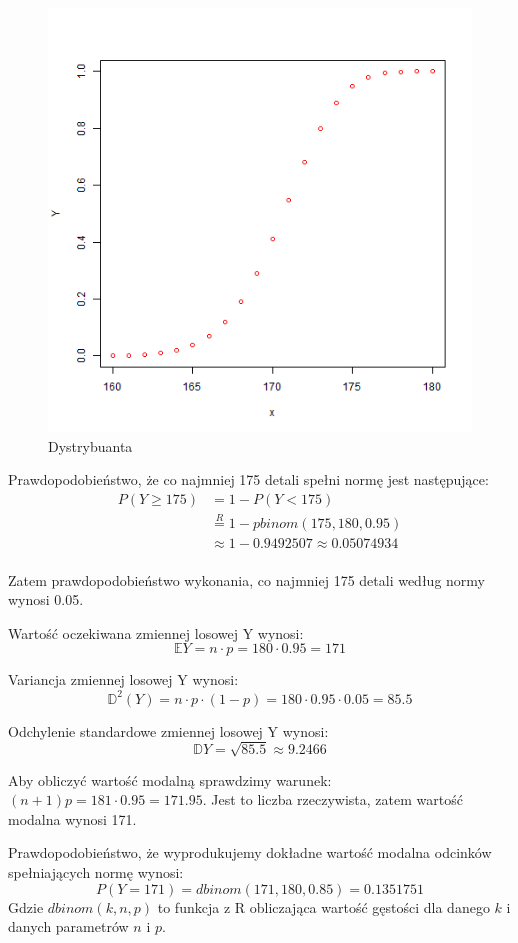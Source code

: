 \documentclass{article}
\begin{document}
\begin{figure}[h!]
\begin{center}
\includegraphics[height=0.4\textheight, angle=0]{"lab4zad1_f.png"}
\caption{Dystrybuanta}
\end{center}
\end{figure}

\newpage
Prawdopodobieństwo, że co najmniej 175 detali spełni normę jest następujące:
\begin{align*}
	P(Y\geq175) & = 1 - P(Y<175) \\
	& \overset{R}{=} 1 - pbinom(175,180,0.95) \\
	& \approx 1 - 0.9492507 \approx 0.05074934
\end{align*} \\
Zatem prawdopodobieństwo wykonania, co najmniej 175 detali według normy wynosi 0.05.
\par
Wartość oczekiwana zmiennej losowej Y wynosi:
$$\mathbb{E}Y = n\cdot p = 180\cdot0.95 = 171$$
\par
Variancja zmiennej losowej Y wynosi:
$$\mathbb{D}^2(Y) = n\cdot p\cdot(1-p) = 180\cdot 0.95\cdot0.05 = 85.5$$
\par
Odchylenie standardowe zmiennej losowej Y wynosi:
$$\mathbb{D}Y = \sqrt{85.5} \approx 9.2466$$
\par
Aby obliczyć wartość modalną sprawdzimy warunek: $(n+1)p = 181\cdot 0.95 = 171.95$. 
Jest to liczba rzeczywista, zatem wartość modalna wynosi 171.
\par
Prawdopodobieństwo, że wyprodukujemy dokładne wartość modalna odcinków spełniających normę wynosi:
$$P(Y=171) = dbinom(171,180,0.85) = 0.1351751$$
Gdzie $dbinom(k,n,p)$ to funkcja z R obliczająca wartość gęstości dla danego $k$ i danych parametrów $n$ i $p$.
\end{document}
